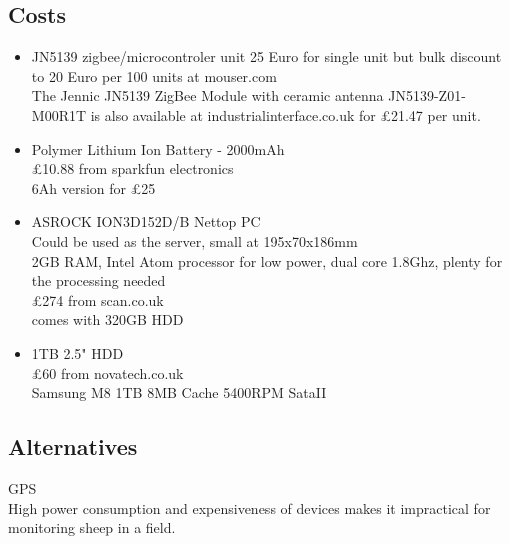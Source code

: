 \documentclass{article}
\begin{document}
\subsection{Costs}
\begin{itemize}
\item JN5139 zigbee/microcontroler unit 25 Euro for single unit but bulk discount to 20 Euro per 100 units at mouser.com
\\The Jennic JN5139 ZigBee Module with ceramic antenna JN5139-Z01-M00R1T is also available at industrialinterface.co.uk for £21.47 per unit.
\item Polymer Lithium Ion Battery - 2000mAh
\\£10.88 from sparkfun electronics
\\6Ah version for £25
\item ASROCK ION3D152D/B Nettop PC
\\Could be used as the server, small at 195x70x186mm
\\2GB RAM, Intel Atom processor for low power, dual core 1.8Ghz, plenty for the processing needed
\\£274 from scan.co.uk
\\comes with 320GB HDD
\item 1TB 2.5" HDD
\\£60 from novatech.co.uk
\\Samsung M8 1TB 8MB Cache 5400RPM SataII
\end{itemize}
\subsection{Alternatives}
GPS
\\High power consumption and expensiveness of devices makes it impractical for monitoring sheep in a field.

\end{document}
